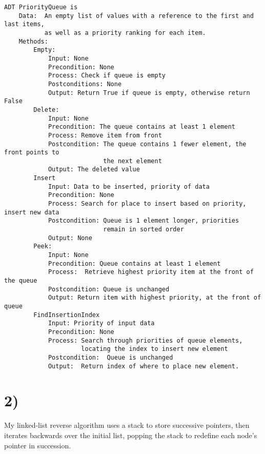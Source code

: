 \documentclass[a4paper,11pt]{article}
\begin{document}
\begin{verbatim}
ADT PriorityQueue is
    Data:  An empty list of values with a reference to the first and last items, 
           as well as a priority ranking for each item.
    Methods:
        Empty:
            Input: None
            Precondition: None
            Process: Check if queue is empty
            Postconditions: None
            Output: Return True if queue is empty, otherwise return False
        Delete:
            Input: None
            Precondition: The queue contains at least 1 element
            Process: Remove item from front 
            Postcondition: The queue contains 1 fewer element, the front points to 
                           the next element
            Output: The deleted value
        Insert
            Input: Data to be inserted, priority of data
            Precondition: None
            Process: Search for place to insert based on priority, insert new data
            Postcondition: Queue is 1 element longer, priorities 
                           remain in sorted order
            Output: None
        Peek:
            Input: None
            Precondition: Queue contains at least 1 element
            Process:  Retrieve highest priority item at the front of the queue
            Postcondition: Queue is unchanged
            Output: Return item with highest priority, at the front of queue
        FindInsertionIndex
            Input: Priority of input data
            Precondition: None
            Process: Search through priorities of queue elements, 
                     locating the index to insert new element
            Postcondition:  Queue is unchanged
            Output:  Return index of where to place new element.
\end{verbatim}


\section*{2)}
My linked-list reverse algorithm uses a stack to store successive pointers, then iterates backwards over the initial list, popping the stack to redefine each node's pointer in succession.
\end{document}
